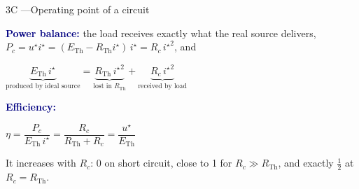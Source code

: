 \documentclass[10pt,a4paper]{article}
\newlength{\colw}
\newenvironment{column}{\begin{minipage}[t]{\colw}\vspace{0pt}}{\end{minipage}}
\newcommand{\ETh}{E_{\mathrm{Th}}}
\newcommand{\RTh}{R_{\mathrm{Th}}}
\newcommand{\ist}{i^{\star}}
\newcommand{\ust}{u^{\star}}
\newcommand{\hd}[1]{\textcolor{navy}{\textbf{#1}}}
\begin{document}
\begin{column}
\begin{panel}{3C \enspace---\enspace Operating point of a circuit}
\begin{itemize}
\end{itemize}
\hd{Power balance:} the load receives exactly what the real source delivers,
$P_c = \ust\ist = (\ETh - \RTh\ist)\,\ist = R_c\,{\ist}^2$, and
\begin{fml}
  $\underbrace{\ETh\,\ist}_{\text{produced by ideal source}}
   = \underbrace{\RTh\,{\ist}^2}_{\text{lost in } \RTh}
   + \underbrace{R_c\,{\ist}^2}_{\text{received by load}}$
\end{fml}
\hd{Efficiency:}
\begin{fml}
  $\eta = \dfrac{P_c}{\ETh\,\ist} = \dfrac{R_c}{\RTh + R_c} = \dfrac{\ust}{\ETh}$
\end{fml}
It increases with $R_c$: $0$ on short circuit, close to 1 for $R_c \gg \RTh$, and
exactly $\tfrac12$ at $R_c = \RTh$.
\end{panel}
\end{column}\hfill
\end{document}
